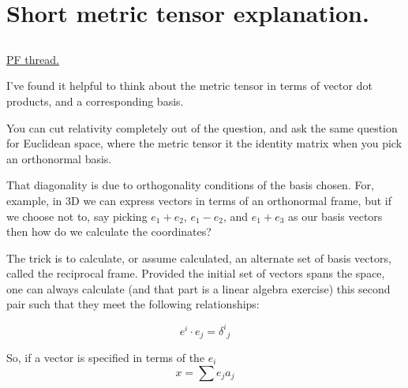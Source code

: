 
%


\chapter{Short metric tensor explanation.}
\date{August 30, 2008.  $RCSfile: lorentzMetricTensor.tex,v $ Last $Revision: 1.8 $ $Date: 2009/06/11 17:00:37 $ }

%


\section{}

\href{http://www.physicsforums.com/showthread.php?p=1853416}{PF thread.}

I've found it helpful to think about the metric tensor in terms of vector dot products, and a corresponding basis.  

You can cut relativity completely out of the question, and ask the same question for Euclidean space, where the metric tensor it the identity matrix when you pick an orthonormal basis.

That diagonality is due to orthogonality conditions of the basis chosen.  For, example, in 3D we can express vectors in terms of an
orthonormal frame, but if we choose not to, say picking $e_1 + e_2$, $e_1-e_2$, and $e_1 + e_3$ as our basis vectors then how do we calculate the coordinates?

The trick is to calculate, or assume calculated, an alternate set of basis vectors, called the reciprocal frame.  Provided the initial set of vectors spans the space, one can always calculate (and that part is a linear algebra exercise) this second pair such that they meet the following relationships:

\begin{equation*}
e^i \cdot e_j = {\delta^i}_j
\end{equation*}

So, if a vector is specified in terms of the $e_i$
\begin{equation*}
x = \sum e_j a_j
\end{equation*}

